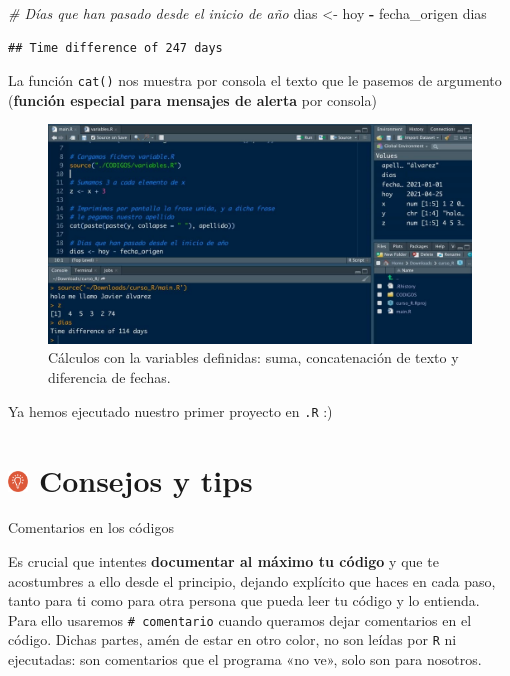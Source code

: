 \documentclass[11pt,]{book}
\newenvironment{Shaded}{\begin{snugshade}}{\end{snugshade}}
\newcommand{\CommentTok}[1]{\textcolor[rgb]{0.37,0.37,0.37}{\textit{#1}}}
\newcommand{\NormalTok}[1]{#1}
\newcommand{\OperatorTok}[1]{\textcolor[rgb]{0.43,0.43,0.43}{\textbf{#1}}}
\newcommand{\StringTok}[1]{\textcolor[rgb]{0.5,0.5,0.5}{#1}}
\begin{document}
\begin{Shaded}
\begin{Highlighting}[]
\CommentTok{# Días que han pasado desde el inicio de año}
\NormalTok{dias <-}\StringTok{ }\NormalTok{hoy }\OperatorTok{-}\StringTok{ }\NormalTok{fecha_origen}
\NormalTok{dias}
\end{Highlighting}
\end{Shaded}

\begin{verbatim}
## Time difference of 247 days
\end{verbatim}

La función \texttt{cat()} nos muestra por consola el texto que le pasemos de argumento (\textbf{función especial para mensajes de alerta} por consola)

\begin{figure}

{\centering \includegraphics[width=0.5\linewidth]{./img/codigo_1} 

}

\caption{Cálculos con la variables definidas: suma, concatenación de texto y diferencia de fechas.}\label{fig:codigo-1}
\end{figure}

Ya hemos ejecutado nuestro primer proyecto en \texttt{.R} :)

\hypertarget{consejos-y-tips-3}{%
\section[ Consejos y tips]{\texorpdfstring{\protect\includegraphics[width=0.04\textwidth,height=\textheight]{img/logo_info.png} Consejos y tips}{ Consejos y tips}}\label{consejos-y-tips-3}}

Comentarios en los códigos

Es crucial que intentes \textbf{documentar al máximo tu código} y que te acostumbres a ello desde el principio, dejando explícito que haces en cada paso, tanto para ti como para otra persona que pueda leer tu código y lo entienda. Para ello usaremos \texttt{\#\ comentario} cuando queramos dejar comentarios en el código. Dichas partes, amén de estar en otro color, no son leídas por \texttt{R} ni ejecutadas: son comentarios que el programa «no ve», solo son para nosotros.
\end{document}
